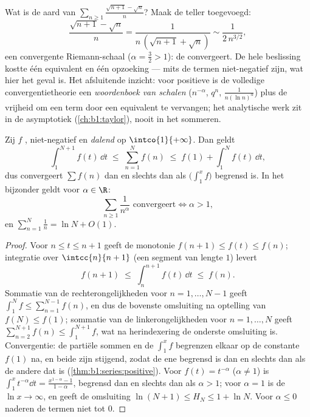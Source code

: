 \begin{example}\label{ex:b1:series:equivtest}
Wat is de aard van $\sum_{n \geq 1} \frac{\sqrt{n+1} - \sqrt
n}{n}$? Maak de teller toegevoegd:
\[
\frac{\sqrt{n+1} - \sqrt n}{n}
= \frac{1}{n\,(\sqrt{n+1} + \sqrt n)}
\sim \frac{1}{2\,n^{3/2}} ,
\]
een convergente Riemann-schaal ($\alpha = \frac32 > 1$): de 
convergeert. De hele beslissing kostte één equivalent en één
opzoeking --- mits de termen niet-negatief zijn, wat hier het
geval is. Het afsluitende inzicht: voor positieve  is de
volledige convergentietheorie een \emph{woordenboek van schalen}
($n^{-\alpha}$, $q^n$, $\frac{1}{n(\ln n)^\alpha}$) plus de
vrijheid om een term door een equivalent te vervangen; het
analytische werk zit in de asymptotiek (\cref{ch:b1:taylor}),
nooit in het sommeren.
\end{example}

\begin{theorem}\label{thm:b1:series:riemann}
Zij $f$ , niet-negatief en \emph{dalend} op
$\intco{1}{+\infty}$. Dan geldt
\[
\int_1^{N+1} f(t)\,\dd t \;\leq\; \sum_{n=1}^{N} f(n) \;\leq\; f(1)
+ \int_1^{N} f(t)\,\dd t ,
\]
dus convergeert $\sum f(n)$ dan en slechts dan als $\bigl(\int_1^x
f\bigr)$ begrensd is. In het bijzonder geldt voor $\alpha \in
\R$:
\[
\sum_{n \geq 1} \frac{1}{n^\alpha} \text{ convergeert}
\iff \alpha > 1,
\]
en $\sum_{n=1}^{N} \frac1n = \ln N + O(1)$.
\end{theorem}

\begin{proof}
Voor $n \leq t \leq n+1$ geeft de monotonie $f(n+1) \leq f(t)
\leq f(n)$; integratie over $\intcc{n}{n+1}$ (een segment van
lengte $1$) levert
\[
f(n+1) \;\leq\; \int_n^{n+1} f(t)\,\dd t \;\leq\; f(n) .
\]
Sommatie van de rechterongelijkheden voor $n = 1, \dots, N-1$
geeft $\int_1^{N} f \leq \sum_{n=1}^{N-1} f(n)$, en dus de
bovenste omsluiting na optelling van $f(N) \leq f(1)$; sommatie
van de linkerongelijkheden voor $n = 1, \dots, N$ geeft
$\sum_{n=2}^{N+1} f(n) \leq \int_1^{N+1} f$, wat na herindexering
de onderste omsluiting is. Convergentie: de partiële sommen en de
 $\int_1^x f$ begrenzen elkaar op de constante $f(1)$
na, en beide zijn stijgend, zodat de ene begrensd is dan en
slechts dan als de andere dat is
(\cref{thm:b1:series:positive}). Voor $f(t) = t^{-\alpha}$
($\alpha \neq 1$) is $\int_1^x t^{-\alpha}\dd t =
\frac{x^{1-\alpha} - 1}{1 - \alpha}$, begrensd dan en slechts dan
als $\alpha > 1$; voor $\alpha = 1$ is de  $\ln x \to
\infty$, en geeft de omsluiting $\ln(N+1) \leq H_N \leq 1 + \ln
N$. Voor $\alpha \leq 0$ naderen de termen niet tot $0$.
\end{proof}

